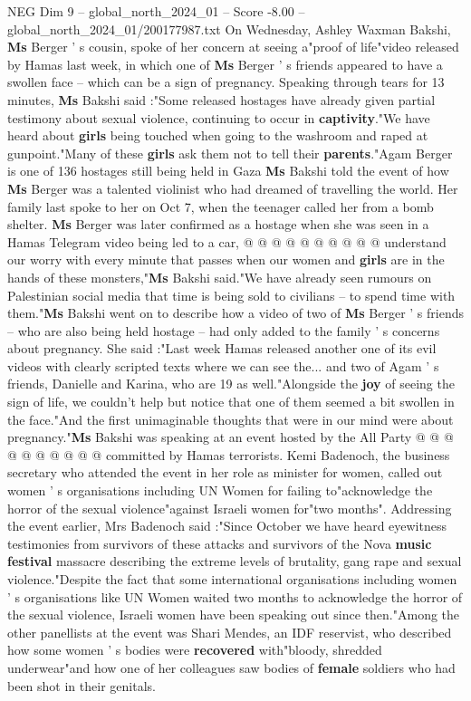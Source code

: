 \begin{textsample}{NEG Dim 9 – global\_north\_2024\_01 – Score -8.00 – global\_north\_2024\_01/200177987.txt}  \label{ex:f9_neg_193}
On Wednesday, Ashley Waxman Bakshi, \textbf{Ms} Berger ' s cousin, spoke of her concern at seeing a"proof of life"video released by Hamas last week, in which one of \textbf{Ms} Berger ' s friends appeared to have a swollen face -- which can be a sign of pregnancy.
Speaking through tears for 13 minutes, \textbf{Ms} Bakshi said :"Some released hostages have already given partial testimony about sexual violence, continuing to occur in \textbf{captivity}."We have heard about \textbf{girls} being touched when going to the washroom and raped at gunpoint."Many of these \textbf{girls} ask them not to tell their \textbf{parents}."Agam Berger is one of 136 hostages still being held in Gaza \textbf{Ms} Bakshi told the event of how \textbf{Ms} Berger was a talented violinist who had dreamed of travelling the world.
Her family last spoke to her on Oct 7, when the teenager called her from a bomb shelter. \textbf{Ms} Berger was later confirmed as a hostage when she was seen in a Hamas Telegram video being led to a car, @ @ @ @ @ @ @ @ @ @ understand our worry with every minute that passes when our women and \textbf{girls} are in the hands of these monsters,"\textbf{Ms} Bakshi said."We have already seen rumours on Palestinian social media that time is being sold to civilians -- to spend time with them."\textbf{Ms} Bakshi went on to describe how a video of two of \textbf{Ms} Berger ' s friends -- who are also being held hostage -- had only added to the family ' s concerns about pregnancy.
She said :"Last week Hamas released another one of its evil videos with clearly scripted texts where we can see the... and two of Agam ' s friends, Danielle and Karina, who are 19 as well."Alongside the \textbf{joy} of seeing the sign of life, we couldn't help but notice that one of them seemed a bit swollen in the face."And the first unimaginable thoughts that were in our mind were about pregnancy."\textbf{Ms} Bakshi was speaking at an event hosted by the All Party @ @ @ @ @ @ @ @ @ @ committed by Hamas terrorists.
Kemi Badenoch, the business secretary who attended the event in her role as minister for women, called out women ' s organisations including UN Women for failing to"acknowledge the horror of the sexual violence"against Israeli women for"two months".
Addressing the event earlier, Mrs Badenoch said :"Since October we have heard eyewitness testimonies from survivors of these attacks and survivors of the Nova \textbf{music} \textbf{festival} massacre describing the extreme levels of brutality, gang rape and sexual violence."Despite the fact that some international organisations including women ' s organisations like UN Women waited two months to acknowledge the horror of the sexual violence, Israeli women have been speaking out since then."Among the other panellists at the event was Shari Mendes, an IDF reservist, who described how some women ' s bodies were \textbf{recovered} with"bloody, shredded underwear"and how one of her colleagues saw bodies of \textbf{female} soldiers who had been shot in their genitals.

\end{textsample}
